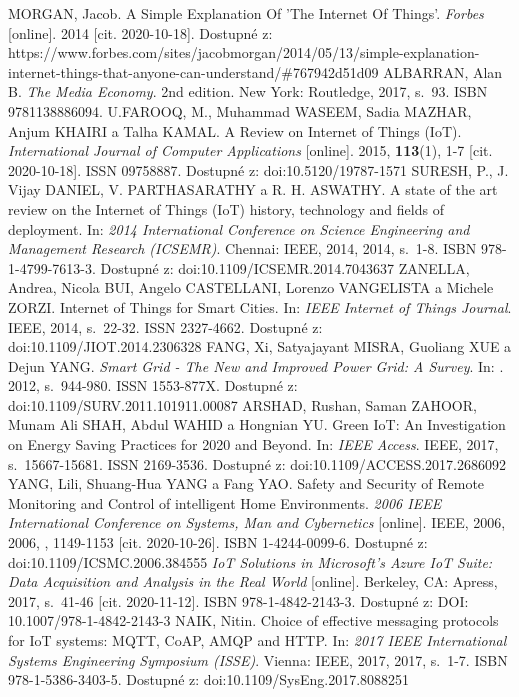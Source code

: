 \documentclass[twoside]{ctuthesis}
\theoremstyle{plain}
\theoremstyle{definition}
\theoremstyle{note}
\begin{document}
\appendix
\begin{thebibliography}{46}
 MORGAN, Jacob. A Simple Explanation Of 'The Internet Of Things'. \textit{Forbes} [online]. 2014 [cit. 2020-10-18]. Dostupné z: https://www.forbes.com/sites/jacobmorgan/2014/05/13/simple-explanation-internet-things-that-anyone-can-understand/\#767942d51d09
 ALBARRAN, Alan B. \textit{The Media Economy}. 2nd edition. New York: Routledge, 2017, s.~93. ISBN 9781138886094.
U.FAROOQ, M., Muhammad WASEEM, Sadia MAZHAR, Anjum KHAIRI a Talha KAMAL. A Review on Internet of Things (IoT). \textit{International Journal of Computer Applications} [online]. 2015, \textbf{113}(1), 1-7 [cit. 2020-10-18]. ISSN 09758887. Dostupné z: doi:10.5120/19787-1571
SURESH, P., J. Vijay DANIEL, V. PARTHASARATHY a R. H. ASWATHY. A state of the art review on the Internet of Things (IoT) history, technology and fields of deployment. In: \textit{2014 International Conference on Science Engineering and Management Research (ICSEMR)}. Chennai: IEEE, 2014, 2014, s.~1-8. ISBN 978-1-4799-7613-3. Dostupné z: doi:10.1109/ICSEMR.2014.7043637
 ZANELLA, Andrea, Nicola BUI, Angelo CASTELLANI, Lorenzo VANGELISTA a Michele ZORZI. Internet of Things for Smart Cities. In: \textit{IEEE Internet of Things Journal}. IEEE, 2014, s.~22-32. ISSN 2327-4662. Dostupné z: doi:10.1109/JIOT.2014.2306328
 FANG, Xi, Satyajayant MISRA, Guoliang XUE a Dejun YANG. \textit{Smart Grid - The New and Improved Power Grid: A Survey}. In: . 2012, s.~944-980. ISSN 1553-877X. Dostupné z: doi:10.1109/SURV.2011.101911.00087
ARSHAD, Rushan, Saman ZAHOOR, Munam Ali SHAH, Abdul WAHID a Hongnian YU. Green IoT: An Investigation on Energy Saving Practices for 2020 and Beyond. In: \textit{IEEE Access}. IEEE, 2017, s.~15667-15681. ISSN 2169-3536. Dostupné z: doi:10.1109/ACCESS.2017.2686092
 YANG, Lili, Shuang-Hua YANG a Fang YAO. Safety and Security of Remote Monitoring and Control of intelligent Home Environments. \textit{2006 IEEE International Conference on Systems, Man and Cybernetics} [online]. IEEE, 2006, 2006, , 1149-1153 [cit. 2020-10-26]. ISBN 1-4244-0099-6. Dostupné z: doi:10.1109/ICSMC.2006.384555
   \textit{IoT Solutions in Microsoft's Azure IoT Suite: Data Acquisition and Analysis in the Real World} [online]. Berkeley, CA: Apress, 2017, s.~41-46 [cit. 2020-11-12]. ISBN 978-1-4842-2143-3. Dostupné z: DOI: 10.1007/978-1-4842-2143-3
   NAIK, Nitin. Choice of effective messaging protocols for IoT systems: MQTT, CoAP, AMQP and HTTP. In: \textit{2017 IEEE International Systems Engineering Symposium (ISSE)}. Vienna: IEEE, 2017, 2017, s.~1-7. ISBN 978-1-5386-3403-5. Dostupné z: doi:10.1109/SysEng.2017.8088251  

\end{thebibliography}
\end{document}
